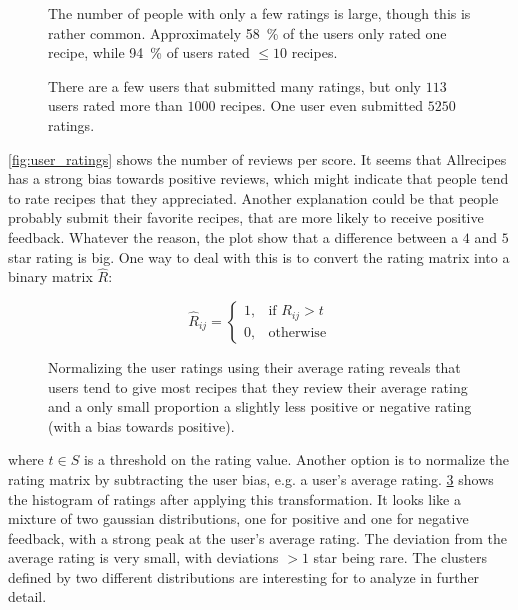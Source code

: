 \begin{figure}[htbp]
	\centering
	
	\caption{The number of people with only a few ratings is large, though this is rather common. Approximately \SI{58}{\percent} of the users only rated one recipe, while \SI{94}{\percent} of users rated $\leq 10$ recipes.}
	\label{fig:user_little_ratings}
\end{figure}

\begin{figure}[htbp]
	\centering
	
	\caption{There are a few users that submitted many ratings, but only $113$ users rated more than $1000$ recipes. One user even submitted $\num{5250}$ ratings.}
	\label{fig:user_many_ratings}
\end{figure}

\cref{fig:user_ratings} shows the number of reviews per score.
It seems that Allrecipes has a strong bias towards positive reviews, which might indicate that people tend to rate recipes that they appreciated.
Another explanation could be that people probably submit their favorite recipes, that are more likely to receive positive feedback.
Whatever the reason, the plot show that a difference between a $4$ and $5$ star rating is big.
One way to deal with this is to convert the rating matrix into a binary matrix $\hat{R}$:

\begin{equation*}
	\tag{Binary Rating matrix}
	\hat{R}_{ij}=
	\begin{cases}
	    1,& \text{if } R_{ij}>t \\
	    0,& \text{otherwise}
	\end{cases}
\end{equation*}

\begin{figure}[htbp]
	\centering
	
	\caption{Normalizing the user ratings using their average rating reveals that users tend to give most recipes that they review their average rating and a only small proportion a slightly less positive or negative rating (with a bias towards positive).}
	\label{fig:normalized_ratings}
\end{figure}

\noindent where $t \in S$ is a threshold on the rating value.
Another option is to normalize the rating matrix by subtracting the user bias, e.g. a user's average rating.
\cref{fig:normalized_ratings} shows the histogram of ratings after applying this transformation.
It looks like a mixture of two gaussian distributions, one for positive and one for negative feedback, with a strong peak at the user's average rating.
The deviation from the average rating is very small, with deviations $>1$ star being rare.
The clusters defined by two different distributions are interesting for to analyze in further detail.


